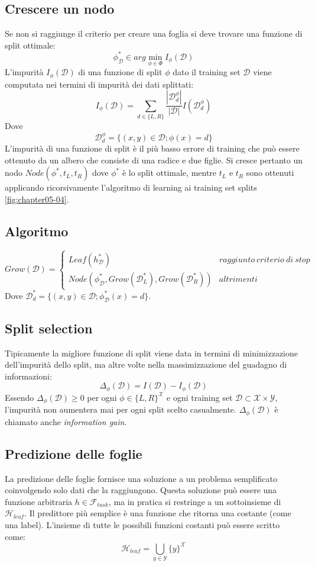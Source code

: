 	\subsection{Crescere un nodo}
	Se non si raggiunge il criterio per creare una foglia si deve trovare una funzione di split ottimale:
	$$\phi^*_\mathcal{D}\in arg\min\limits_{\phi\in\Phi}I_\phi(\mathcal{D})$$
	L'impurit\`a $I_\phi(\mathcal{D})$ di una funzione di split $\phi$ dato il training set $\mathcal{D}$ viene computata nei termini di impurit\`a dei dati splittati:
	$$I_\phi(\mathcal{D})=\sum\limits_{d\in\{L,R\}}\dfrac{|\mathcal{D}^\phi_d|}{|\mathcal{D}|}I(\mathcal{D}^\phi_d)$$
	Dove
	$$\mathcal{D}^\phi_d = \{(x, y)\in\mathcal{D};\phi(x)=d\}$$
	L'impurit\`a di una funzione di split \`e il pi\`u basso errore di training che pu\`o essere ottenuto da un albero che consiste di una radice e due figlie.
	Si cresce pertanto un nodo $Node(\phi^*, t_L, t_R)$ dove $\phi^*$ \`e lo split ottimale, mentre $t_L$ e $t_R$ sono ottenuti applicando ricorsivamente l'algoritmo di learning ai training set splits \ref{fig:chapter05-04}. 

	\subsection{Algoritmo}
		$$Grow(\mathcal{D})=\begin{cases}Leaf(h^*_\mathcal{D}) &raggiunto\ criterio\ di\ stop\\
			 									 Node(\phi^*_\mathcal{D}, Grow(\mathcal{D}^*_L), Grow(\mathcal{D}^*_R)) &altrimenti
						\end{cases}$$
	Dove $\mathcal{D}^*_d=\{(x, y)\in\mathcal{D};\phi^*_\mathcal{D}(x)=d\}$.

	\subsection{Split selection}
	Tipicamente la migliore funzione di split viene data in termini di minimizzazione dell'impurit\`a dello split, ma altre volte nella massimizzazione del guadagno di informazioni:
	$$\Delta_\phi(\mathcal{D})=I(\mathcal{D})-I_\phi(\mathcal{D})$$
	Essendo $\Delta_\phi(\mathcal{D})\ge 0$ per ogni $\phi\in\{L,R\}^{\mathcal{X}}$ e ogni training set $\mathcal{D}\subset\mathcal{X}\times\mathcal{Y}$, l'impurit\`a non aumentera mai per ogni split scelto casualmente. $\Delta_\phi(\mathcal{D})$ \`e chiamato anche \emph{information gain}.

	\subsection{Predizione delle foglie}
	La predizione delle foglie fornisce una soluzione a un problema semplificato coinvolgendo solo dati che la raggiungono.
	Questa soluzione pu\`o essere una funzione arbitraria $h\in\mathcal{F}_{task}$, ma in pratica si restringe a un sottoinsieme di $\mathcal{H}_{leaf}$.
	Il predittore pi\`u semplice \`e una funzione che ritorna una costante (come una label).
	L'insieme di tutte le possibili funzioni costanti pu\`o essere scritto come:
	$$\mathcal{H}_{leaf} = \bigcup\limits_{y\in\mathcal{Y}}\{y\}^{\mathcal{X}}$$

